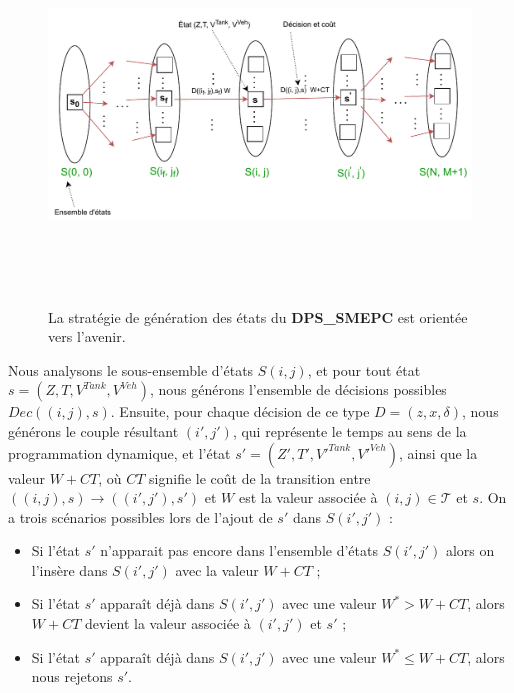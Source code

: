 \begin{figure}[H]
	\centerline{
		\includegraphics[height=10cm]{images_these/Ens_etats.pdf}}
	\caption[Stratégie de génération des états du DPS\_SMEPC]{La stratégie de génération des états du \textbf{DPS\_SMEPC} est orientée vers l'avenir.}
	\label{Ens_etats}
\end{figure}
Nous analysons le sous-ensemble d'états $S(i, j)$, et pour tout état $s = (Z, T, V^{Tank} , V^{Veh})$, nous générons l'ensemble de décisions possibles $Dec((i, j), s)$. 
Ensuite, pour chaque décision de ce type $D = (z, x, \delta)$, nous générons le couple résultant $(i', j')$, qui représente le temps au sens de la programmation dynamique, et l'état $s' = (Z', T', V'^{Tank} , V'^{Veh})$, ainsi que la valeur $W + CT$, où $CT$ signifie le coût de la transition entre $((i, j), s) \rightarrow ((i', j'), s')$ et $W$ est la valeur associée à $(i, j) \in \mathcal{T}$ et $s$. On a trois scénarios possibles lors de l'ajout de $s'$ dans $S(i',j')$ :
\begin{itemize}[label=$\square$]
	\item Si l'état $s'$ n'apparait pas encore dans l'ensemble d'états $S(i',j')$ alors on l'insère dans $S(i',j')$ avec la valeur $W + CT$ ;
	\item Si l'état $s'$ apparaît déjà dans $S(i', j')$ avec une valeur $W^* > W + CT$, alors $W + CT$ devient la valeur associée à $(i', j')$ et $s'$ ;
	\item Si l'état $s'$ apparaît déjà dans $S(i', j')$ avec une valeur $W^* \leq W + CT$, alors nous rejetons $s'$.
	 
\end{itemize}
